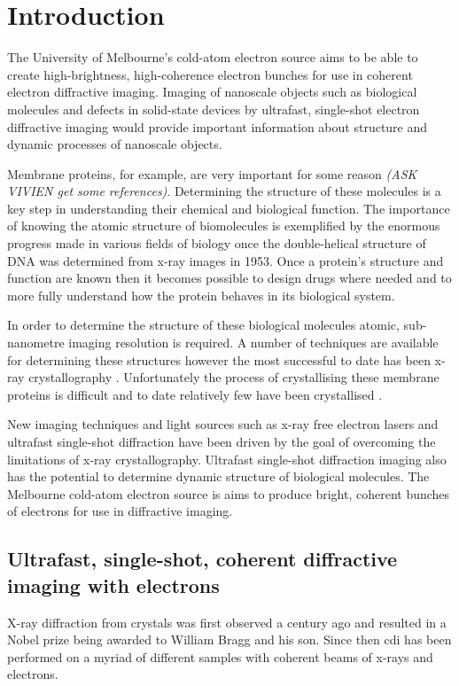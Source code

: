 \section{Introduction}

The University of Melbourne's cold-atom electron source aims to be able to create high-brightness, high-coherence electron bunches for use in coherent electron diffractive imaging. Imaging of nanoscale objects such as biological molecules\cite{dwyer_femtosecond_2006, williamson_clocking_1997} and defects in solid-state devices\cite{siwick_atomic-level_2003} by ultrafast, single-shot electron diffractive imaging would provide important information about structure and dynamic processes of nanoscale objects.

Membrane proteins, for example, are very important for some reason \emph{(ASK VIVIEN get some references)}. Determining the structure of these molecules is a key step in understanding their chemical and biological function. The importance of knowing the atomic structure of biomolecules is exemplified by the enormous progress made in various fields of biology once the double-helical structure of DNA was determined from x-ray images in 1953\cite{watson_molecular_1953}. Once a protein's structure and function are known then it becomes possible to design drugs\cite{pinto_influenza_1992} where needed and to more fully understand how the protein behaves in its biological system.

In order to determine the structure of these biological molecules atomic, sub-nanometre imaging resolution is required. A number of techniques are available for determining these structures \cite{nettleship_methods_2008, svergun_small-angle_2003, opella_structure_2004} however the most successful to date has been x-ray crystallography \cite{kendrew_three-dimensional_1958, uson_advances_1999}. Unfortunately the process of crystallising these membrane proteins is difficult and to date relatively few have been crystallised \cite{geerlof_impact_2006}.

New imaging techniques and light sources such as x-ray free electron lasers and  ultrafast single-shot diffraction have been driven by the goal of overcoming the limitations of x-ray crystallography. Ultrafast single-shot diffraction imaging also has the potential to determine dynamic structure of biological molecules. The Melbourne cold-atom electron source is aims to produce bright, coherent bunches of electrons for use in diffractive imaging.

\subsection{Ultrafast, single-shot, coherent diffractive imaging with electrons}
X-ray diffraction from crystals was first observed a century ago\cite{bragg_x-rays_1912} and resulted in a Nobel prize being awarded to William Bragg and his son. Since then \gls{cdi} has been performed on a myriad of different samples with coherent beams of x-rays and electrons.

